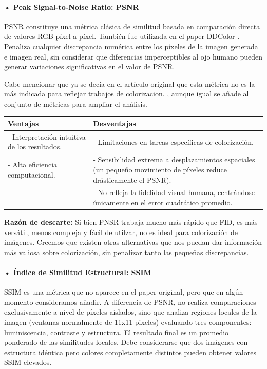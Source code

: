 \documentclass[a4paper]{article}
\begin{document}
\paragraph{ • Peak Signal-to-Noise Ratio: PSNR \cite{PSNR}}

PSNR constituye una métrica clásica de similitud basada en comparación directa de valores RGB píxel a píxel. También fue utilizada en el paper DDColor \cite{DDColor}. Penaliza cualquier discrepancia numérica entre los píxeles de la imagen generada e imagen real, sin considerar que diferencias imperceptibles al ojo humano pueden generar variaciones significativas en el valor de PSNR.

Cabe mencionar que ya se decía en el artículo original que esta métrica no es la más indicada para reflejar trabajos de colorizacion. \cite{DDColor}, aunque igual se añade al conjunto de métricas para ampliar el análisis.

\begin{table}[h]
	\centering
	\begin{tabular}{|p{}|p{}|}
		\hline
		\textbf{Ventajas} & \textbf{Desventajas} 
		\\ \hline
		- Interpretación intuitiva de los resultados. & - Limitaciones en tareas específicas de colorización. \\
		- Alta eficiencia computacional. & - Sensibilidad extrema a desplazamientos espaciales (un pequeño movimiento de píxeles reduce drásticamente el PSNR). \\
		& - No refleja la fidelidad visual humana, centrándose únicamente en el error cuadrático promedio. \\ \hline
	\end{tabular}
\end{table}

\textbf{Razón de descarte:} Si bien PNSR trabaja mucho más rápido que FID, es más versátil, menos compleja y fácil de utilzar, no es ideal para colorización de imágenes. Creemos que existen otras alternativas que nos puedan dar información más valiosa sobre colorización, sin penalizar tanto las pequeñas discrepancias. 

\paragraph{ • Índice de Similitud Estructural: SSIM \cite{SSIM}}

SSIM es una métrica que no aparece en el paper original, pero que en algún momento consideramos añadir. A diferencia de PSNR, no realiza comparaciones exclusivamente a nivel de píxeles aislados, sino que analiza regiones locales de la imagen (ventanas normalmente de 11x11 pixeles) evaluando tres componentes: luminiscencia, contraste y estructura. El resultado final es un promedio ponderado de las similitudes locales. Debe considerarse que dos imágenes con estructura idéntica pero colores completamente distintos pueden obtener valores SSIM elevados.
\end{document}
